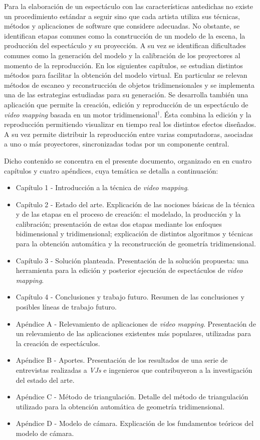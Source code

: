 Para la elaboración de un espectáculo con las características antedichas no existe un procedimiento estándar a seguir sino que cada artista utiliza sus técnicas, métodos y aplicaciones de software que considere adecuadas. No obstante, se identifican etapas comunes como la construcción de un modelo de la escena, la producción del espectáculo y su proyección. A su vez se identifican dificultades comunes como la generación del modelo y la calibración de los proyectores al momento de la reproducción.
En los siguientes capítulos, se estudian distintos métodos para facilitar la obtención del modelo virtual. En particular se relevan métodos de escaneo y reconstrucción de objetos tridimensionales y se implementa una de las estrategias estudiadas para su generación.
Se desarrolla también una aplicación que permite la creación, edición y reproducción de un espectáculo de \emph{video mapping} basada en un motor tridimensional$^\dagger$. Ésta combina la edición y la reproducción permitiendo visualizar en tiempo real los distintos efectos diseñados. A su vez permite distribuir la reproducción entre varias computadoras, asociadas a uno o más proyectores, sincronizadas todas por un componente central.

Dicho contenido se concentra en el presente documento, organizado en en cuatro capítulos y cuatro apéndices, cuya temática se detalla a continuación:
\begin{itemize}
\item Capítulo 1 - Introducción a la técnica de \emph{video mapping}.
\item Capítulo 2 - Estado del arte. Explicación de las nociones básicas de la técnica y de las etapas en el proceso de creación: el modelado, la producción y la calibración; presentación de estas dos etapas mediante los enfoques bidimensional y tridimensional; explicación de distintos algoritmos y técnicas para la obtención automática y la reconstrucción de geometría tridimensional.
\item Capítulo 3 - Solución planteada. Presentación de la solución propuesta: una herramienta para la edición y posterior ejecución de espectáculos de \emph{video mapping}.
\item Capítulo 4 - Conclusiones y trabajo futuro. Resumen de las conclusiones y posibles líneas de trabajo futuro.
\item Apéndice A - Relevamiento de aplicaciones de \emph{video mapping}. Presentación de un relevamiento de las aplicaciones existentes más populares, utilizadas para la creación de espectáculos.
\item Apéndice B - Aportes. Presentación de los resultados de una serie de entrevistas realizadas a  \emph{VJs} e ingenieros que contribuyeron a la investigación del estado del arte.
\item Apéndice C - Método de triangulación. Detalle del método de triangulación utilizado para la obtención automática de geometría tridimensional.
\item Apéndice D - Modelo de cámara. Explicación de los fundamentos teóricos del modelo de cámara.
\end{itemize}